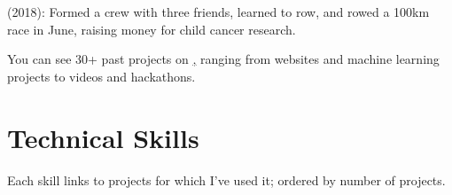 \documentclass[]{deedy-resume-openfont}
\begin{document}
\begin{minipage}[t]{0.66\textwidth}
\vspace{0.3\topsep}
\href{http://keihardroeien.nl/}{} (2018): Formed a crew with three friends, learned to row, and rowed a 100km race in June, raising money for child cancer research.

\vspace{0.2cm}
You can see 30+ past projects on \href{http://leonoverweel.com/}{,} ranging from websites and machine learning projects to videos and hackathons.

\vspace{0.3\topsep}


\section{Technical Skills}

Each skill links to projects for which I've used it; ordered by number of projects.

\vspace{0.3\topsep}
\href{https://leonoverweel.com/tags/language-python/}{} \textbullet \
\href{https://leonoverweel.com/tags/language-css/}{} \textbullet \
\href{https://leonoverweel.com/tags/language-html/}{} \textbullet \
\href{https://leonoverweel.com/tags/language-javascript/}{} \textbullet \
\href{https://leonoverweel.com/tags/language-c++/}{} \textbullet \
\href{https://leonoverweel.com/tags/language-java/}{}

\vspace{0.3\topsep}
\custombold{Technical Tools:}
\href{https://leonoverweel.com/tags/tool-git/}{\custombold{Git}} \textbullet \
\href{https://leonoverweel.com/tags/tool-github/}{} \textbullet \
\href{https://leonoverweel.com/tags/tool-google-app-engine/}{} \textbullet \
\href{https://leonoverweel.com/tags/tool-flask/}{} \textbullet \
\href{https://leonoverweel.com/tags/tool-github-pages/}{}

\vspace{0.3\topsep}
\href{https://leonoverweel.com/tags/ml-numpy/}{} \textbullet \
\href{https://leonoverweel.com/tags/ml-matplotlib/}{} \textbullet \
\href{https://leonoverweel.com/tags/ml-pytorch/}{} \textbullet \
\href{https://leonoverweel.com/tags/ml-plotly/}{} \textbullet \
\href{https://leonoverweel.com/tags/ml-scipy/}{}


\end{minipage}
\end{document}
